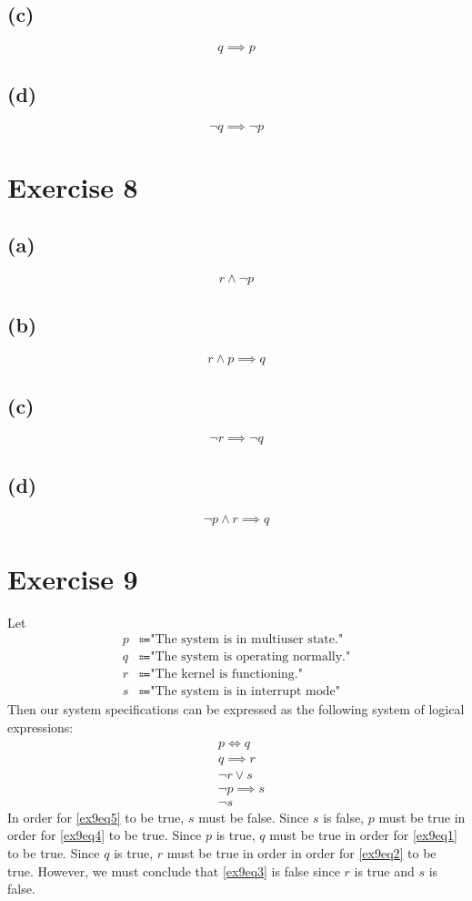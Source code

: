 \documentclass{article}
\begin{document}
\subsection{(c)}
\[
	q \implies p
\]
\subsection{(d)}
\[
	\neg q \implies \neg p
\]

\pagebreak

\section{Exercise 8}

\subsection{(a)}
\[
	r \land \neg p
\]

\subsection{(b)}
\[
	r \land p \implies q
\]

\subsection{(c)}
\[
	\neg r \implies \neg q
\]
\subsection{(d)}
\[
	\neg p \land r \implies q
\]

\pagebreak

\section{Exercise 9}
Let
\begin{align*}
	p & \Coloneqq \text{"The system is in multiuser state."} \\
	q & \Coloneqq \text{"The system is operating normally."} \\
	r & \Coloneqq \text{"The kernel is functioning."}        \\
	s & \Coloneqq \text{"The system is in interrupt mode"}
\end{align*}
Then our system specifications can be expressed as the following system of logical expressions:
\begin{align}
	 & p \iff q \label{ex9eq1}          \\
	 & q \implies r \label{ex9eq2}      \\
	 & \neg r \lor s \label{ex9eq3}     \\
	 & \neg p \implies s \label{ex9eq4} \\
	 & \neg s \label{ex9eq5}
\end{align}
In order for \eqref{ex9eq5} to be true, $s$ must be false.  Since $s$ is false, $p$ must be true in order for \eqref{ex9eq4} to be true. Since $p$ is true, $q$ must be true in order for \eqref{ex9eq1} to be true. Since $q$ is true, $r$ must be true in order in order for \eqref{ex9eq2} to be true.  However, we must conclude that \eqref{ex9eq3} is false since $r$ is true and $s$ is false.
\end{document}
